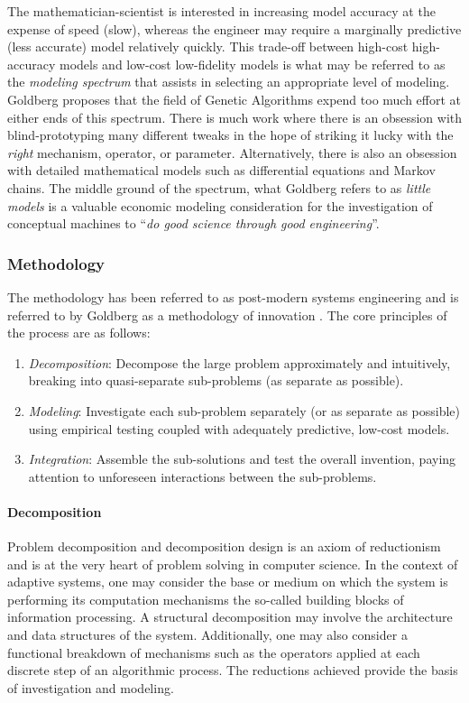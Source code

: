 The mathematician-scientist is interested in increasing model accuracy at the expense of speed (slow), whereas the engineer may require a marginally predictive (less accurate) model relatively quickly. This trade-off between high-cost high-accuracy models and low-cost low-fidelity models is what may be referred to as the \emph{modeling spectrum} that assists in selecting an appropriate level of modeling. Goldberg proposes that the field of Genetic Algorithms expend too much effort at either ends of this spectrum. There is much work where there is an obsession with blind-prototyping many different tweaks in the hope of striking it lucky with the \emph{right} mechanism, operator, or parameter. Alternatively, there is also an obsession with detailed mathematical models such as differential equations and Markov chains. The middle ground of the spectrum, what Goldberg refers to as \emph{little models} is a valuable economic modeling consideration for the investigation of conceptual machines to ``\emph{do good science through good engineering}''. 

\subsubsection{Methodology}
The methodology has been referred to as post-modern systems engineering and is referred to by Goldberg as a methodology of innovation \cite{Goldberg2004}. The core principles of the process are as follows: 

\begin{enumerate}
	\item \emph{Decomposition}: Decompose the large problem approximately and intuitively, breaking into quasi-separate sub-problems (as separate as possible).
	\item \emph{Modeling}: Investigate each sub-problem separately (or as separate as possible) using empirical testing coupled with adequately predictive, low-cost models.
	\item \emph{Integration}: Assemble the sub-solutions and test the overall invention, paying attention to unforeseen interactions between the sub-problems.
\end{enumerate}

\paragraph{Decomposition} 
Problem decomposition and decomposition design is an axiom of reductionism and is at the very heart of problem solving in computer science. In the context of adaptive systems, one may consider the base or medium on which the system is performing its computation mechanisms the so-called building blocks of information processing. A structural decomposition may involve the architecture and data structures of the system. Additionally, one may also consider a functional breakdown of mechanisms such as the operators applied at each discrete step of an algorithmic process. The reductions achieved provide the basis of investigation and modeling.

